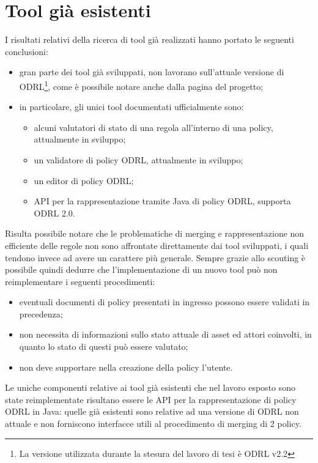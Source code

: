 \documentclass[12pt,a4paper,twoside]{book}
\begin{document}
\section{Tool già esistenti}
I risultati relativi della ricerca di tool già realizzati hanno portato le seguenti conclusioni:
\begin{itemize}
	\item gran parte dei tool già sviluppati, non lavorano sull'attuale versione di ODRL\footnote{La versione utilizzata durante la stesura del lavoro di tesi è ODRL v2.2 }, come è possibile notare anche dalla pagina del progetto\cite{ODRLPage};
	\item in particolare, gli unici tool documentati ufficialmente sono:
	\begin{itemize}
		\item alcuni valutatori di stato di una regola all'interno di una policy\cite{evalStatus}, attualmente in sviluppo;
		\item un validatore di policy ODRL\cite{validator}, attualmente in sviluppo;
		\item un editor di policy ODRL\cite{editor};
		\item API per la rappresentazione tramite Java di policy ODRL\cite{api}, supporta ODRL 2.0.
	\end{itemize}
\end{itemize}
Risulta possibile notare che le problematiche di merging e rappresentazione non efficiente delle regole non sono affrontate direttamente dai tool sviluppati, i quali tendono invece ad avere un carattere più generale. Sempre grazie allo scouting è possibile quindi dedurre che l'implementazione di un nuovo tool può non reimplementare i seguenti procedimenti:
\begin{itemize}
	\item eventuali documenti di policy presentati in ingresso possono essere validati in precedenza;
	\item non necessita di informazioni sullo stato attuale di asset ed attori coinvolti, in quanto lo stato di questi può essere valutato;
	\item non deve supportare nella creazione della policy l'utente.
\end{itemize}
Le uniche componenti relative ai tool già esistenti che nel lavoro esposto sono state reimplementate risultano essere le API per la rappresentazione di policy ODRL in Java: quelle già esistenti sono relative ad una versione di ODRL non attuale e non forniscono interfacce utili al procedimento di merging di 2 policy. 
\end{document}
